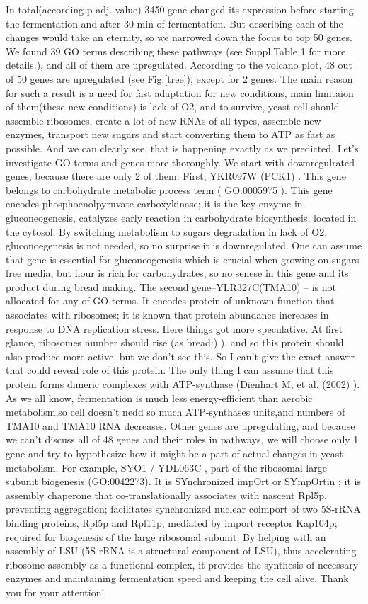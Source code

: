 \documentclass{article}
\begin{document}
 In total(according p-adj. value) 3450 gene changed its expression before starting the fermentation and after 30 min of fermentation. But describing each of the changes would take an eternity, so we narrowed down the focus to top 50 genes. We found 39 GO terms describing these pathways (see Suppl.Table 1 for more details.), and all of them are upregulated. According to the volcano plot, 48 out of 50 genes are upregulated (see Fig.\ref{tree}), except for 2 genes. 
 The main reason for such a result is a need for fast adaptation for new conditions, main limitaion of them(these new conditions) is lack of O2, and to survive, yeast cell should assemble ribosomes, create a lot of new RNAs of all types, assemble new enzymes, transport new sugars and start converting them to ATP as fast as possible. And we can clearly see, that is happening exactly as we predicted. Let's investigate GO terms and genes more thoroughly.
 We start with downregulrated genes, because there are only 2 of them. First, YKR097W (PCK1)\cite{11} . This gene belongs to carbohydrate metabolic process term ( GO:0005975 ). This gene encodes phosphoenolpyruvate carboxykinase; it is the key enzyme in gluconeogenesis, catalyzes early reaction in carbohydrate biosynthesis, located in the cytosol. By switching metabolism to sugars degradation in lack of O2, gluconoegenesis is not needed, so no surprise it is downregulated. One can assume that gene is essential for gluconeogenesis which is crucial when growing on sugars-free media, but flour is rich for carbohydrates, so no senese in this gene and its product during bread making. 
 The second gene--YLR327C(TMA10)\cite{21}  -- is not allocated for any of GO terms. It encodes protein of unknown function that associates with ribosomes; it is known that protein abundance increases in response to DNA replication stress. Here things got more speculative. At first glance, ribosomes number should rise (as bread:) ), and so this protein should also produce more active, but we don't see this. So I can't give the exact answer that could reveal role of this protein. The only thing I can assume that this protein forms dimeric complexes with ATP-synthase (Dienhart M, et al. (2002)\cite{31} ). As we all know, fermentation is much less energy-efficient than aerobic metabolism,so cell doesn't nedd so much ATP-synthases units,and numbers of TMA10 and TMA10 RNA decreases.
 Other genes are upregulating, and because we can't discuss all of 48 genes and their roles in pathways, we will choose only 1 gene and try to hypothesize how it might be a part of actual changes in yeast metabolism. For example, SYO1 / YDL063C \cite{41}, part of the ribosomal large subunit biogenesis (GO:0042273). It is SYnchronized impOrt or SYmpOrtin ; it is assembly chaperone that co-translationally associates with nascent Rpl5p, preventing aggregation; facilitates synchronized nuclear coimport of two 5S-rRNA binding proteins, Rpl5p and Rpl11p, mediated by import receptor Kap104p; required for biogenesis of the large ribosomal subunit. By helping with an assembly of LSU (5S rRNA is a structural component of LSU), thus accelerating ribosome assembly as a functional complex, it provides the synthesis of necessary enzymes and maintaining fermentation speed and keeping the cell alive.
 Thank you for your attention!
 
\end{document}
